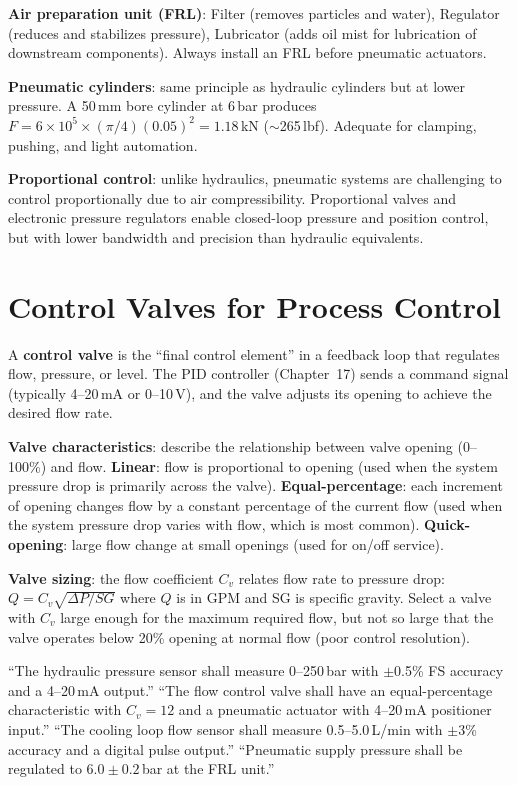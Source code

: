 \documentclass[11pt,letterpaper,twoside,openany]{book}
\begin{document}
\textbf{Air preparation unit (FRL)}: Filter (removes particles and water), Regulator (reduces and stabilizes pressure), Lubricator (adds oil mist for lubrication of downstream components). Always install an FRL before pneumatic actuators.

\textbf{Pneumatic cylinders}: same principle as hydraulic cylinders but at lower pressure. A 50\,mm bore cylinder at 6\,bar produces $F = 6 \times 10^5 \times (\pi/4)(0.05)^2 = 1.18$\,kN ($\sim$265\,lbf). Adequate for clamping, pushing, and light automation.

\textbf{Proportional control}: unlike hydraulics, pneumatic systems are challenging to control proportionally due to air compressibility. Proportional valves and electronic pressure regulators enable closed-loop pressure and position control, but with lower bandwidth and precision than hydraulic equivalents.

\section{Control Valves for Process Control}

A \textbf{control valve} is the ``final control element'' in a feedback loop that regulates flow, pressure, or level. The PID controller (Chapter~17) sends a command signal (typically 4--20\,mA or 0--10\,V), and the valve adjusts its opening to achieve the desired flow rate.

\textbf{Valve characteristics}: describe the relationship between valve opening (0--100\%) and flow. \textbf{Linear}: flow is proportional to opening (used when the system pressure drop is primarily across the valve). \textbf{Equal-percentage}: each increment of opening changes flow by a constant percentage of the current flow (used when the system pressure drop varies with flow, which is most common). \textbf{Quick-opening}: large flow change at small openings (used for on/off service).

\textbf{Valve sizing}: the flow coefficient $C_v$ relates flow rate to pressure drop: $Q = C_v \sqrt{\Delta P/SG}$ where $Q$ is in GPM and SG is specific gravity. Select a valve with $C_v$ large enough for the maximum required flow, but not so large that the valve operates below 20\% opening at normal flow (poor control resolution).

\begin{keyconceptbox}
``The hydraulic pressure sensor shall measure 0--250\,bar with $\pm$0.5\% FS accuracy and a 4--20\,mA output.'' ``The flow control valve shall have an equal-percentage characteristic with $C_v = 12$ and a pneumatic actuator with 4--20\,mA positioner input.'' ``The cooling loop flow sensor shall measure 0.5--5.0\,L/min with $\pm$3\% accuracy and a digital pulse output.'' ``Pneumatic supply pressure shall be regulated to $6.0 \pm 0.2$\,bar at the FRL unit.''
\end{keyconceptbox}
\end{document}
